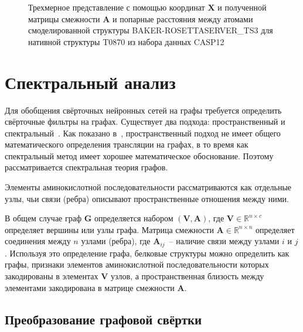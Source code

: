 \documentclass[14pt]{extarticle}
\begin{document}
\begin{figure}[H]
\begin{minipage}[b]{0.49\textwidth}
	\end{minipage}
	\caption{Трехмерное представление с помощью координат $\textbf{X}$ и полученной матрицы смежности $\textbf{A}$ и попарные расстояния между атомами смоделированной структуры BAKER-ROSETTASERVER\_TS3 для нативной структуры T0870 из набора данных CASP12}
	\label{protein_vis}
\end{figure}


\section{Спектральный анализ}

Для обобщения свёрточных нейронных сетей на графы требуется определить свёрточные фильтры на графах. Существует два подхода: пространственный и спектральный~\cite{DBLP:journals/corr/abs-1901-00596, DBLP:journals/corr/abs-1812-08434}. Как показано в~\cite{ae482107de73461787258f805cf8f4ed}, пространственный подход не имеет общего математического определения трансляции на графах, в то время как спектральный метод имеет хорошее математическое обоснование. Поэтому рассматривается спектральная теория графов.

Элементы аминокислотной последовательности рассматриваются как отдельные узлы, чьи связи (ребра) описывают пространственные отношения между ними. 

В общем случае граф $\mathbf{G}$ определяется набором $\mathbf{(V, A)}$, где $\mathbf{V}\in \mathbb{R}^{n \times c}$ определяет вершины или узлы графа. Матрица смежности $\mathbf{A}\in \mathbb{R}^{n \times n}$ определяет соединения между $n$ узлами (ребра), где $\mathbf{A}_{ij}$~-- наличие связи между узлами $i$ и $j$. Используя это определение графа, белковые структуры можно определить как графы, признаки элементов аминокислотной последовательности которых закодированы в элементах $\mathbf{V}$ узлов, а пространственная близость между элементами закодирована в матрице смежности $\mathbf{A}$.

\subsection{Преобразование графовой свёртки}
\end{document}
